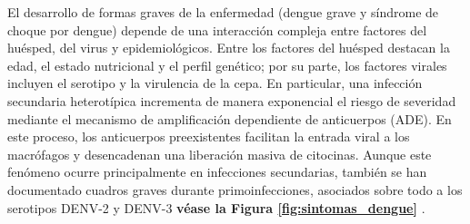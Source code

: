 El desarrollo de formas graves de la enfermedad (dengue grave y síndrome de choque por dengue) depende de una interacción compleja entre factores del huésped, del virus y epidemiológicos. Entre los factores del huésped destacan la edad, el estado nutricional y el perfil genético; por su parte, los factores virales incluyen el serotipo y la virulencia de la cepa. En particular, una infección secundaria heterotípica incrementa de manera exponencial el riesgo de severidad mediante el mecanismo de amplificación dependiente de anticuerpos (ADE). En este proceso, los anticuerpos preexistentes facilitan la entrada viral a los macrófagos y desencadenan una liberación masiva de citocinas. Aunque este fenómeno ocurre principalmente en infecciones secundarias, también se han documentado cuadros graves durante primoinfecciones, asociados sobre todo a los serotipos DENV-2 y DENV-3 \textbf{véase la Figura \ref{fig:sintomas_dengue}} \cite{fajardo2012dengue}.

